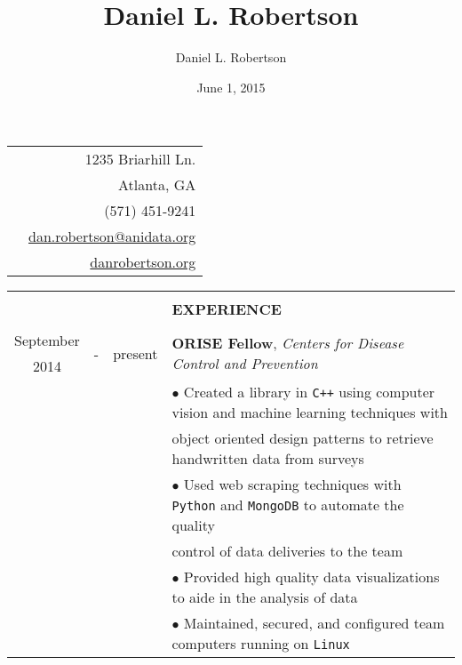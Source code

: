 \documentclass[10pt]{article}
\title{Daniel L. Robertson}
\date{June 1, 2015}
\author{Daniel L. Robertson}
\begin{document}
    \normalfont
    \begin{table}[ht]
        \begin{tabular}{p{13cm}r}
            \multirow{5}{*}{\hspace*{1cm}\color{maroon}{\huge\textbf{Daniel L. Robertson}}} & 1235 Briarhill Ln.\\
            & Atlanta, GA\\
            & (571) 451-9241\\
            & \href{mailto:dan.robertson@anidata.org}{dan.robertson@anidata.org}\\
            & \href{http://danrobertson.org}{danrobertson.org}\\
        \end{tabular}
        \begin{tabular}{@{\hspace{0mm}}c@{\hspace{1mm}}c@{\hspace{3mm}}cl}
            & & & \color{maroon}{\rule{14cm}{0.75pt}}\\
            & & & \large{\textbf{EXPERIENCE}}\\
            & & & \color{maroon}{\rule{14cm}{0.75pt}}\\
            September & \multirow{2}{*}{-} & \multirow{2}{*}{present} & \multirow{2}{*}{\textbf{ORISE Fellow}, \textit{Centers for Disease Control and Prevention}}\\
            2014 & & &\\
            & & & $\bullet$ Created a library in \texttt{C++} using computer vision and machine learning techniques with\\
            & & & \hspace*{4mm}object oriented design patterns to retrieve handwritten data from surveys\\
            & & & $\bullet$ Used web scraping techniques with \texttt{Python} and \texttt{MongoDB} to automate the quality\\
            & & & \hspace*{4mm}control of data deliveries to the team\\
            & & & $\bullet$ Provided high quality data visualizations to aide in the analysis of data\\
            & & & $\bullet$ Maintained, secured, and configured team computers running on \texttt{Linux}\\

\end{tabular}
\end{table}
\end{document}
